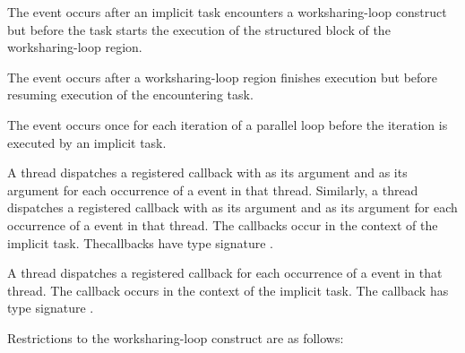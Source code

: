 \events

The  event occurs after an implicit task encounters a
worksharing-loop construct but before the task starts the execution of the structured
block of the worksharing-loop region.

The  event occurs after a worksharing-loop region finishes
execution but before resuming execution of the encountering task.

The  event occurs once for each iteration of a
parallel loop before the iteration is executed by an implicit task.

\tools

A thread dispatches a registered  callback with
 as its  argument and 
as its  argument for each occurrence of a 
event in that thread. Similarly, a thread dispatches a registered
 callback with  as its
 argument and  as its  argument
for each occurrence of a  event in that thread. The callbacks
occur in the context of the implicit task. Thecallbacks have type
signature .

A thread dispatches a registered 
callback for each occurrence of a  
event in that thread. The callback occurs in the
context of the implicit task.  The callback has type signature
. 

\restrictions
Restrictions to the worksharing-loop construct are as follows:

